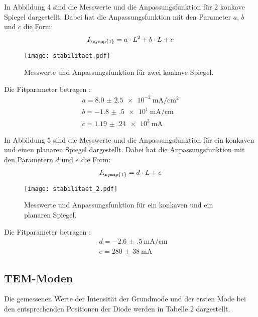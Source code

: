 In Abbildung 4 sind die Messwerte und die Anpassungsfunktion für 2 konkave Spiegel dargestellt.
Dabei hat die Anpassungsfunktion mit den Parameter $a$, $b$ und $c$ die Form:
\begin{align*}
  I_{\symup{1}} = a \cdot L^2 + b \cdot L + c
\end{align*}
\begin{figure}[H]
  \centering
  \texttt{[image: stabilitaet.pdf]}
  \caption{Messwerte und Anpassungsfunktion für zwei konkave Spiegel.}
  \label{fig:plot}
\end{figure}

Die Fitparameter betragen :
\begin{align*}
  a = \SI{ 8.0(25)e-2}{\milli\ampere\per\centi\meter\squared} \\
  b = \SI{-1.8(5)e1}{\milli\ampere\per\centi\meter} \\
  c = \SI{1.19(24)e3}{\milli\ampere}
\end{align*}


In Abbildung 5 sind die Messwerte und die Anpassungsfunktion für ein konkaven und einen
planaren Spiegel dargestellt.
Dabei hat die Anpassungsfunktion mit den Parametern $d$ und $e$ die Form:
\begin{align*}
  I_{\symup{1}} = d \cdot L + e
\end{align*}

\begin{figure}[H]
  \centering
  \texttt{[image: stabilitaet\_2.pdf]}
  \caption{Messwerte und Anpassungsfunktion für ein konkaven und ein planaren Spiegel.}
  \label{fig:plot}
\end{figure}

Die Fitparameter betragen :
\begin{align*}
  &d = \SI{-2.6(5)}{\milli\ampere\per\centi\meter} \\
  &e = \SI{280(38)}{\milli\ampere}
\end{align*}

\subsection{TEM-Moden}
Die gemessenen Werte der Intensität der Grundmode und der ersten Mode bei den
entsprechenden Positionen der Diode werden in Tabelle 2 dargestellt.

